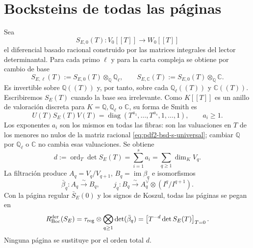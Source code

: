 \section{Bocksteins de todas las páginas}

Sea
\begin{equation}\label{eq:pdf2-bsd-s-universal}
 S_{E,0}(T):V_0[[T]]\longrightarrow W_0[[T]]
\end{equation}
el diferencial basado racional construido por las matrices integrales del
lector determinantal. Para cada primo $\ell$ y para la carta compleja se
obtiene por cambio de base
\begin{equation}\label{eq:pdf2-bsd-s-todos-ell}
 S_{E,\ell}(T):=S_{E,0}(T)\otimes_{\mathbb Q}\mathbb Q_\ell,
 \qquad
 S_{E,\mathbb C}(T):=S_{E,0}(T)\otimes_{\mathbb Q}\mathbb C.
\end{equation}
Es invertible sobre $\mathbb Q((T))$ y, por tanto, sobre cada
$\mathbb Q_\ell((T))$ y $\mathbb C((T))$. Escribiremos $S_E(T)$ cuando la
base sea irrelevante. Como $K[[T]]$ es un anillo de valoración discreta para
$K=\mathbb Q,\mathbb Q_\ell$ o $\mathbb C$, su forma de Smith es
\begin{equation}\label{eq:pdf2-bsd-smith-t-adico}
 U(T)S_E(T)V(T)=\operatorname{diag}
 (T^{a_1},\ldots,T^{a_s},1,\ldots,1),
 \qquad a_i\ge1.
\end{equation}
Los exponentes $a_i$ son los mismos en todas las fibras: son las valuaciones
en $T$ de los menores no nulos de la matriz racional
\eqref{eq:pdf2-bsd-s-universal}; cambiar $\mathbb Q$ por
$\mathbb Q_\ell$ o $\mathbb C$ no cambia esas valuaciones.
Se obtiene
\begin{equation}\label{eq:pdf2-bsd-orden-smith}
 d:=\operatorname{ord}_T\det S_E(T)
 =\sum_{i=1}^sa_i
 =\sum_{q\ge1}\dim_K V_q.
\end{equation}
La filtración produce $A_q=V_q/V_{q+1}$,
$B_q=\operatorname{im}\beta_q$ e isomorfismos
\begin{equation}\label{eq:pdf2-bsd-bockstein-reducido}
 \bar\beta_q:A_q\xrightarrow{\sim}B_q,
 \qquad
 j_q:B_q\xrightarrow{\sim}A_q^\vee\otimes(I^q/I^{q+1}).
\end{equation}
Con la página regular $\bar S_E(0)$ y los signos de Koszul, todas las
páginas se pegan en
\begin{equation}\label{eq:pdf2-bsd-rboc-lt}
 R_{\rm Boc}^{\rm der}(S_E)
 =\tau_{\rm reg}\otimes\bigotimes_{q\ge1}\det(\bar\beta_q)
 =\left[T^{-d}\det S_E(T)\right]_{T=0}.
\end{equation}
Ninguna página se sustituye por el orden total $d$.

